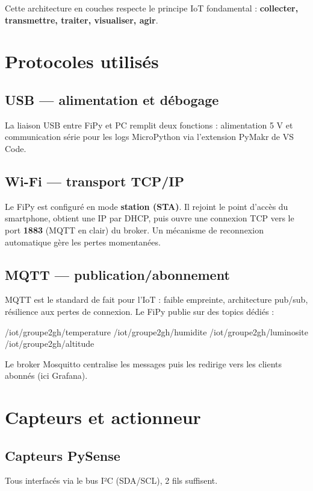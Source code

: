 \documentclass[11pt,a4paper]{article}
\begin{document}
\medskip
Cette architecture en couches respecte le principe IoT fondamental : \textbf{collecter, transmettre, traiter, visualiser, agir}.

\section{Protocoles utilisés}

\subsection{USB — alimentation et débogage}
La liaison USB entre FiPy et PC remplit deux fonctions : alimentation 5 V et communication série pour les logs MicroPython via l'extension PyMakr de VS Code.

\subsection{Wi-Fi — transport TCP/IP}
Le FiPy est configuré en mode \textbf{station (STA)}. Il rejoint le point d'accès du smartphone, obtient une IP par DHCP, puis ouvre une connexion TCP vers le port \textbf{1883} (MQTT en clair) du broker. Un mécanisme de reconnexion automatique gère les pertes momentanées.

\subsection{MQTT — publication/abonnement}
MQTT est le standard de fait pour l'IoT : faible empreinte, architecture pub/sub, résilience aux pertes de connexion. Le FiPy publie sur des topics dédiés :

\begin{codebox}
/iot/groupe2gh/temperature
/iot/groupe2gh/humidite
/iot/groupe2gh/luminosite
/iot/groupe2gh/altitude
\end{codebox}

Le broker Mosquitto centralise les messages puis les redirige vers les clients abonnés (ici Grafana).

\section{Capteurs et actionneur}

\subsection{Capteurs PySense}
Tous interfacés via le bus I²C (SDA/SCL), 2 fils suffisent.
\end{document}
